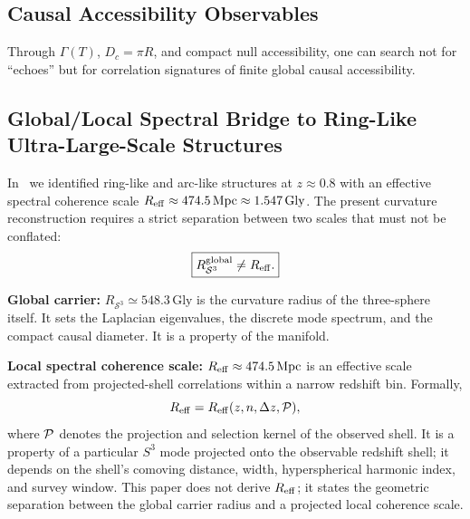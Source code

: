\documentclass[aps,prd,onecolumn,superscriptaddress,longbibliography,nofootinbib,notitlepage]{revtex4-2}
\newcommand{\Gly}{\,\mathrm{Gly}}
\newcommand{\GammaT}{\Gamma(T)}
\begin{document}
\subsection{Causal Accessibility Observables}

Through $\GammaT$, $D_c = \pi R$, and compact null accessibility, one can search
not for ``echoes'' but for correlation signatures of finite global causal
accessibility.

\subsection{Global/Local Spectral Bridge to Ring-Like Ultra-Large-Scale Structures}
\label{sec:rings}

In~\cite{Preece2026rings} we identified ring-like and arc-like structures at
$z \approx 0.8$ with an effective spectral coherence scale
$R_{\rm eff} \approx 474.5\,\mathrm{Mpc} \approx 1.547\Gly$.
The present curvature reconstruction requires a strict separation between two
scales that must not be conflated:
\begin{equation}
  \boxed{R_{\mathcal{S}^3}^{\rm global} \neq R_{\rm eff}.}
\end{equation}

\textbf{Global carrier:}
$R_{\mathcal{S}^3}\simeq548.3\Gly$ is the curvature radius of the three-sphere
itself. It sets the Laplacian eigenvalues, the discrete mode spectrum, and the
compact causal diameter. It is a property of the manifold.

\textbf{Local spectral coherence scale:}
$R_{\rm eff} \approx 474.5\,\mathrm{Mpc}$ is an effective scale extracted from
projected-shell correlations within a narrow redshift bin. Formally,
\begin{equation}
  R_{\rm eff}=R_{\rm eff}(z,n,\Delta z,{\cal P}),
\end{equation}
where ${\cal P}$ denotes the projection and selection kernel of the observed
shell. It is a property of a particular $S^3$ mode projected onto the observable
redshift shell; it depends on the shell's comoving distance, width,
hyperspherical harmonic index, and survey window. This paper does not derive
$R_{\rm eff}$; it states the geometric separation between the global carrier
radius and a projected local coherence scale.
\end{document}

